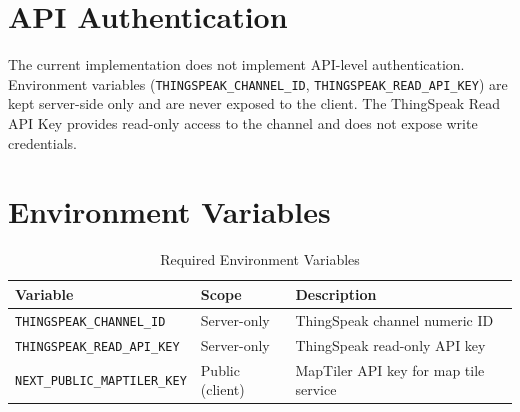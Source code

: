 \section{API Authentication}

The current implementation does not implement API-level authentication. Environment variables (\texttt{THINGSPEAK\_\allowbreak{}CHANNEL\_\allowbreak{}ID}, \texttt{THINGSPEAK\_\allowbreak{}READ\_\allowbreak{}API\_\allowbreak{}KEY}) are kept server-side only and are never exposed to the client. The ThingSpeak Read API Key provides read-only access to the channel and does not expose write credentials.

\section{Environment Variables}

\begin{table}[H]
\centering
\caption{Required Environment Variables}
\begin{tabularx}{\linewidth}{|l|l|X|}
\hline
\rowcolor{FloodLight}
\textbf{Variable} & \textbf{Scope} & \textbf{Description} \\
\hline
\texttt{THINGSPEAK\_\allowbreak{}CHANNEL\_\allowbreak{}ID} & Server-only & ThingSpeak channel numeric ID \\
\texttt{THINGSPEAK\_\allowbreak{}READ\_\allowbreak{}API\_\allowbreak{}KEY} & Server-only & ThingSpeak read-only API key \\
\texttt{NEXT\_\allowbreak{}PUBLIC\_\allowbreak{}MAPTILER\_\allowbreak{}KEY} & Public (client) & MapTiler API key for map tile service \\
\hline
\end{tabularx}
\end{table}
